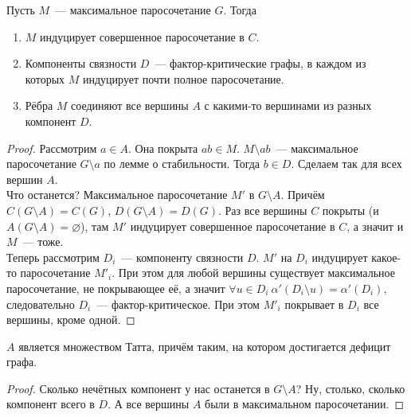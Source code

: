 \documentclass{article}
\begin{document}
    \begin{theorem}
        Пусть $M$~--- максимальное паросочетание $G$. Тогда
        \begin{enumerate}
            \item $M$ индуцирует совершенное паросочетание в $C$.
            \item Компоненты связности $D$~--- фактор-критические графы, в каждом из которых $M$ индуцирует почти полное паросочетание.
            \item Рёбра $M$ соединяют все вершины $A$ с какими-то вершинами из разных компонент $D$.
        \end{enumerate}
    \end{theorem}
    \begin{proof}
        Рассмотрим $a\in A$. Она покрыта $ab\in M$. $M\setminus ab$~--- максимальное паросочетание $G\setminus a$ по лемме о стабильности. Тогда $b\in D$. Сделаем так для всех вершин $A$.\\
        Что останется? Максимальное паросочетание $M'$ в $G\setminus A$. Причём $C(G\setminus A)=C(G)$, $D(G\setminus A)=D(G)$. Раз все вершины $C$ покрыты (и $A(G\setminus A)=\varnothing$), там $M'$ индуцирует совершенное паросочетание в $C$, а значит и $M$~--- тоже.\\
        Теперь рассмотрим $D_i$~--- компоненту связности $D$. $M'$ на $D_i$ индуцирует какое-то паросочетание $M'_i$. При этом для любой вершины существует максимальное паросочетание, не покрывающее её, а значит $\forall u\in D_i~\alpha'(D_i\setminus u)=\alpha'(D_i)$, следовательно $D_i$~--- фактор-критическое. При этом $M'_i$ покрывает в $D_i$ все вершины, кроме одной.
    \end{proof}
    \begin{corollary}
        $A$ является множеством Татта, причём таким, на котором достигается дефицит графа.
    \end{corollary}
    \begin{proof}
        Сколько нечётных компонент у нас останется в $G\setminus A$? Ну, столько, сколько компонент всего в $D$. А все вершины $A$ были в максимальном паросочетании.
    \end{proof}
\end{document}
